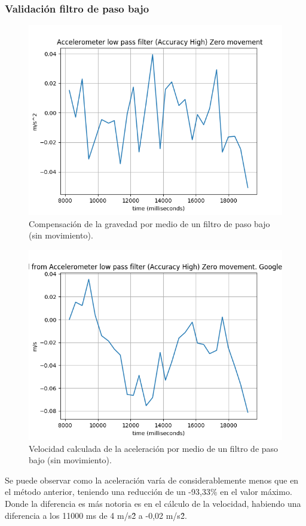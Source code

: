 \subsubsection{Validación filtro de paso bajo}

\begin{figure}[H]
	\centering
	\includegraphics[scale=0.5]{imagenes/lowpass0mov.png}
	\caption{Compensación de la gravedad por medio de un filtro de paso bajo (sin movimiento).}
	\label{Movimiento cero filtro paso bajo}
\end{figure}

\begin{figure}[H]
	\centering
	\includegraphics[scale=0.5]{imagenes/lowpass0movspeed.png}
	\caption{Velocidad calculada de la aceleración por medio de un filtro de paso bajo (sin movimiento).}
	\label{Velocidad cero filtro paso bajo}
\end{figure}
\noindent
Se puede observar como la aceleración varía de considerablemente menos que en el método anterior, teniendo una reducción de un -93,33\% en el valor máximo. Donde la diferencia es más notoria es en el cálculo de la velocidad, habiendo una diferencia a los 11000 ms de 4 m/s\^2 a -0,02 m/s\^2.


